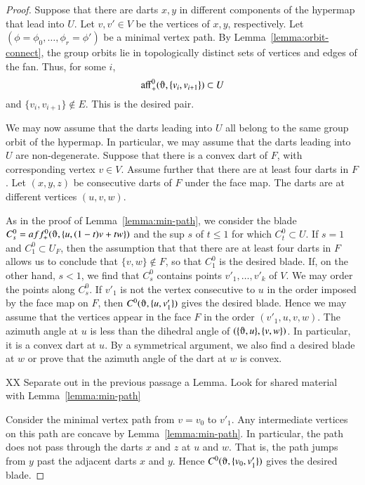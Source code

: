 \begin{proof} Suppose that there are darts $x,y$ in different components
of the hypermap that lead into $U$.  Let $v,v'\in V$ be the vertices of $x,y$, respectively.
Let $(\phi=\phi_0,\ldots,\phi_r=\phi')$ be a minimal vertex path.
By Lemma~\ref{lemma:orbit-connect},  the group orbits
lie in topologically distinct sets of vertices and edges of the fan.   
Thus, for some $i$,
   $$
   \op{aff}_+^0(\orgn,\{v_i,v_{i+1}\})\subset U
   $$
and $\{v_i,v_{i+1}\}\not\in E$.  This is the desired pair.

We may now assume that the darts leading into $U$ all belong to the same
group orbit of the hypermap.  In particular, we may assume that
the darts leading into $U$ are non-degenerate.
Suppose that there is a convex  dart of $F$, with corresponding vertex $v\in V$.
Assume further that there are at least four darts in $F$.
Let $(x,y,z)$ be consecutive darts of $F$ under the face map.  
The darts are at different vertices $(u,v,w)$.  


As in the proof of 
Lemma~\ref{lemma:min-path}, we consider the blade $C^0_s= aff_+^0(\orgn,\{u,(1-t)v + t w\})$ and the
sup $s$ of $t\le 1$ for which $C^0_t\subset U$.  If $s=1$ and $C^0_1\subset U_F$,
then the assumption that that there are at least four darts in $F$ allows us
to conclude that $\{v,w\}\not\in F$, so that $C^0_1$ is the desired blade.
If, on the other hand, $s<1$, we find that $C^0_s$ contains points
$v'_1,\ldots,v'_k$ of $V$.  We may order the points along $C^0_s$.  If
$v'_1$ is not the vertex consecutive to $u$ in the order imposed by the face map on $F$,
then $C^0(\orgn,\{u,v'_1\})$ gives the desired blade.  Hence we may assume that
the vertices appear in the face $F$ in the order $(v'_1,u,v,w)$.  The azimuth
angle at $u$ is less than the dihedral angle of $(\{\orgn,u\},\{v,w\})$.  In particular,
it is a convex dart at $u$.  By a symmetrical argument, we also find a desired blade at $w$
or prove that the azimuth angle of the dart at $w$ is convex.

XX Separate out in the previous passage a Lemma.  Look for shared material with Lemma~\ref{lemma:min-path}  

Consider the minimal vertex path from $v=v_0$ to $v'_1$.  Any intermediate
vertices on this path are concave by Lemma~\ref{lemma:min-path}.  
In particular, the path
does not pass through the darts $x$ and $z$ at $u$ and $w$.  That is, the path
jumps from $y$ past the adjacent darts $x$ and $y$.  Hence 
$C^0(\orgn,\{v_0,v'_1\})$ gives the desired blade.
\end{proof}



